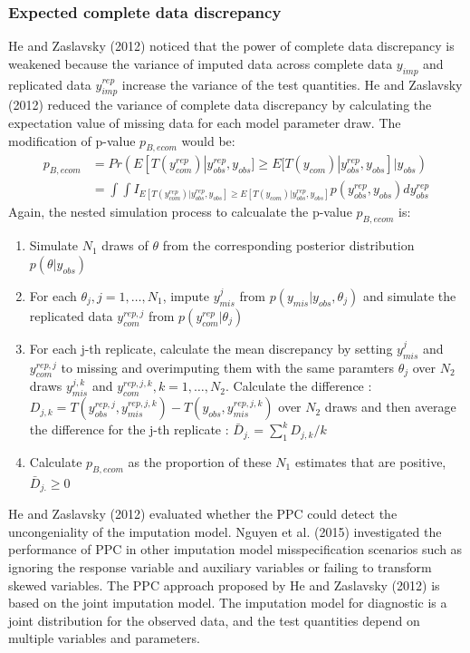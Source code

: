 \documentclass[12pt, fullpage, a4paper]{article}
\begin{document}
\subsubsection{Expected complete data discrepancy}
He and Zaslavsky (2012) noticed that the power of complete data discrepancy is weakened because the variance of imputed data across complete data $y_{imp}$ and replicated data $y_{imp}^{rep}$ increase the variance of the test quantities. He and Zaslavsky (2012) reduced the variance of complete data discrepancy by calculating the expectation value of missing data for each model parameter draw. 
The modification of p-value $p_{B, ecom}$ would be:  
\begin{equation}
\begin{array}{ll}
p_{B, ecom} &= Pr(E[T(y_{com}^{rep})|y_{obs}^{rep}, y_{obs}] \ge E[T(y_{com})|y_{obs}^{rep}, y_{obs}]|y_{obs})\\
&= \int\int I_{E[T(y_{com}^{rep})|y_{obs}^{rep}, y_{obs}] \ge E[T(y_{com})|y_{obs}^{rep}, y_{obs}]}p(y_{obs}^{rep}, y_{obs})dy_{obs}^{rep}
\end{array} 
\end{equation}
Again, the nested simulation process to calcualate the p-value $p_{B, ecom}$ is:
\begin{enumerate}
	\item Simulate $N_{1}$ draws of $\theta$ from the corresponding posterior distribution $p(\theta|y_{obs})$
	\item For each $\theta_{j}, j=1, \dots, N_{1}$, impute $y_{mis}^j$ from $p(y_{mis}|y_{obs}, \theta_{j})$ and simulate the replicated data $y_{com}^{rep, j}$ from $p(y_{com}^{rep}|\theta_{j})$
	\item For each j-th replicate, calculate the mean discrepancy by setting $y_{mis}^j$ and $y_{com}^{rep, j}$ to missing and overimputing them with the same paramters $\theta_{j}$ over $N_{2}$ draws $y_{mis}^{j, k}$ and $y_{com}^{rep, j, k}, k = 1, \dots, N_{2}$. Calculate the difference : $D_{j, k} = T(y_{obs}^{rep, j}, y_{mis}^{rep, j, k}) - T(y_{obs}, y_{mis}^{rep, j, k})$ over $N_{2}$ draws and then average the difference for the j-th replicate : $\bar{D}_{j.} = \sum_{1}^{k}D_{j, k}/k$
	\item Calculate $p_{B, ecom}$ as the proportion of these $N_{1}$ estimates that are positive, $\bar{D}_{j.} \ge 0$    
\end{enumerate}

He and Zaslavsky (2012) evaluated whether the PPC could detect the uncongeniality of the imputation model. Nguyen et al. (2015) investigated the performance of PPC in other imputation model misspecification scenarios such as ignoring the response variable and auxiliary variables or failing to transform skewed variables. The PPC approach proposed by He and Zaslavsky (2012) is based on the joint imputation model. The imputation model for diagnostic is a joint distribution for the observed data, and the test quantities depend on multiple variables and parameters. 
 
\end{document}
